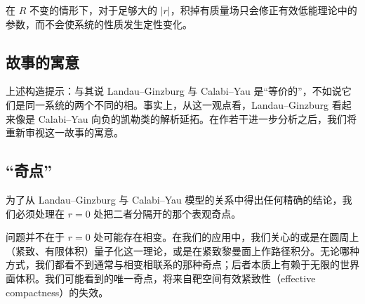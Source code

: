 \label{op:20}
在 $R$ 不变的情形下，对于足够大的 $|r|$，积掉有质量场只会修正有效低能理论中的参数，而不会使系统的性质发生定性变化。

\subsection*{故事的寓意}

上述构造提示：与其说 Landau--Ginzburg 与 Calabi--Yau 是“等价的”，不如说它们是同一系统的两个不同的相。事实上，从这一观点看，Landau--Ginzburg 看起来像是 Calabi--Yau 向负的凯勒类的解析延拓。在作若干进一步分析之后，我们将重新审视这一故事的寓意。

\subsection{“奇点”}

为了从 Landau--Ginzburg 与 Calabi--Yau 模型的关系中得出任何精确的结论，我们必须处理在 $r=0$ 处把二者分隔开的那个表观奇点。

问题并不在于 $r=0$ 处可能存在相变。在我们的应用中，我们关心的或是在圆周上（紧致、有限体积）量子化这一理论，或是在紧致黎曼面上作路径积分。无论哪种方式，我们都看不到通常与相变相联系的那种奇点；后者本质上有赖于无限的世界面体积。我们可能看到的唯一奇点，将来自靶空间有效紧致性（effective compactness）的失效。


